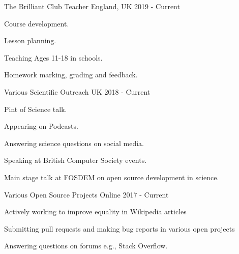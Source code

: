 \begin{cventries}
   \cventry
    {The Brilliant Club}
    {Teacher} %
    {England, UK}
    {2019 - Current}
    {\begin{cvitems} %
        \item {Course development.}
        \item {Lesson planning.}
        \item {Teaching Ages 11-18 in schools.}
        \item {Homework marking, grading and feedback.}
      \end{cvitems}} %

   \cventry
    {Various}
    {Scientific Outreach} %
    {UK}
    {2018 - Current}
    {\begin{cvitems} %
        \item {Pint of Science talk.}
        \item {Appearing on Podcasts.}
        \item {Answering science questions on social media.}
        \item {Speaking at British Computer Society events.}
        \item {Main stage talk at FOSDEM on open source development in science.}
      \end{cvitems}} %

   \cventry
    {Various}
    {Open Source Projects} %
    {Online}
    {2017 - Current}
    {
    \begin{cvitems} %
        \item {Actively working to improve equality in Wikipedia articles}
        \item {Submitting pull requests and making bug reports in various open projects}
        \item {Answering questions on forums e.g., Stack Overflow.}
      \end{cvitems}} %
    


\end{cventries}